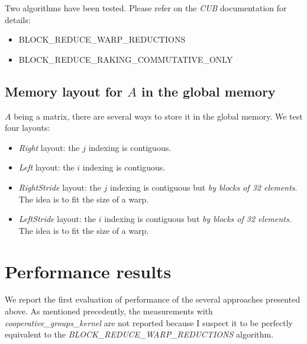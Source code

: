 \documentclass{article}
\begin{document}
Two algorithms have been tested. Please refer on the \textit{CUB} documentation for details:

\begin{itemize}
\item BLOCK\_REDUCE\_WARP\_REDUCTIONS
\item BLOCK\_REDUCE\_RAKING\_COMMUTATIVE\_ONLY 
\end{itemize}

\subsection{Memory layout for $A$ in the global memory}

$A$ being a matrix, there are several ways to store it in the global memory. We test four layouts:

\begin{itemize}
	\item \textit{Right} layout: the $j$ indexing is contiguous.
	\item \textit{Left} layout: the $i$ indexing is contiguous.
	\item \textit{RightStride} layout: the $j$ indexing is contiguous but \textit{by blocks of 32 elements}. The idea is to fit the size of a warp.
	\item \textit{LeftStride} layout: the $i$ indexing is contiguous but \textit{by blocks of 32 elements}. The idea is to fit the size of a warp.
\end{itemize}

\section{Performance results}

We report the first evaluation of performance of the several approaches presented above. As mentioned precedently, the measurements with \textit{cooperative\_groups\_kernel} are not reported because I suspect it to be perfectly equivalent to the \textit{BLOCK\_REDUCE\_WARP\_REDUCTIONS} algorithm.

\newpage
\nocite{*}


\end{document}
